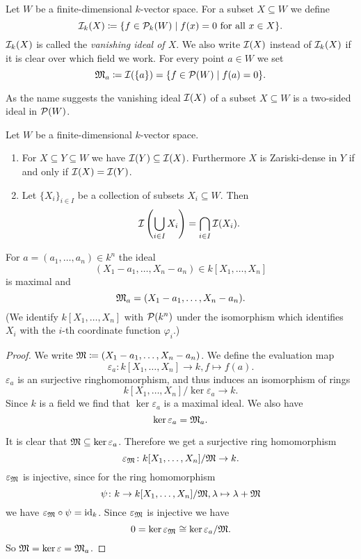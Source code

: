 \begin{defi}
  Let $W$ be a finite-dimensional $k$-vector space. For a subset $X \subseteq W$ we define
  \[
    \mathcal{I}_k(X) \coloneqq \{ f \in \mathcal{P}_k(W) \mid f(x) = 0 \text{ for all } x \in X \}.
  \]
  $\mathcal{I}_k(X)$ is called the \emph{vanishing ideal of $X$}. We also write $\mathcal{I}(X)$ instead of $\mathcal{I}_k(X)$ if it is clear over which field we work.
  For every point $a \in W$ we set
  \[
    \mathfrak{M}_a \coloneqq \mathcal{I}(\{a\}) = \{f \in \mathcal{P}(W) \mid f(a) = 0\}.
  \]
\end{defi}


\begin{rem}
  As the name suggests the vanishing ideal $\mathcal{I}(X)$ of a subset $X \subseteq W$ is a two-sided ideal in $\mathcal{P}(W)$.
\end{rem}


\begin{rem}
  Let $W$ be a finite-dimensional $k$-vector space.
  \begin{enumerate}[label=\emph{\alph*)},leftmargin=*]
    \item
      For $X \subseteq Y \subseteq W$ we have $\mathcal{I}(Y) \subseteq \mathcal{I}(X)$. Furthermore $X$ is Zariski-dense in $Y$ if and only if $\mathcal{I}(X) = \mathcal{I}(Y)$.
    \item
      Let $\{X_i\}_{i \in I}$ be a collection of subsets $X_i \subseteq W$. Then
      \[
        \mathcal{I}\left( \bigcup_{i \in I} X_i \right) = \bigcap_{i \in I} \mathcal{I}(X_i).
      \]
  \end{enumerate}
\end{rem}


\begin{lem}
  For $a = (a_1, \dotsc, a_n) \in k^n$ the ideal
  \[
    (X_1 - a_1, \dotsc, X_n - a_n) \in k[X_1, \dotsc, X_n]
  \]
  is maximal and
  \[
    \mathfrak{M}_a = (X_1 - a_1, \dotsc, X_n - a_n).
  \]
  (We identify $k[X_1, \dotsc, X_n]$ with $\mathcal{P}(k^n)$ under the isomorphism which identifies $X_i$ with the $i$-th coordinate function $\varphi_i$.)
\end{lem}
\begin{proof}
  We write $\mathfrak{M} \coloneqq (X_1 - a_1, \dotsc, X_n - a_n)$. We define the evaluation map
  \[
    \varepsilon_a \colon k[X_1, \dotsc, X_n] \to k, f \mapsto f(a).
  \]
  $\varepsilon_a$ is an surjective ringhomomorphism, and thus induces an isomorphism of rings
  \[
    k[X_1, \dotsc, X_n]/\ker \varepsilon_a \to k.
  \]
  Since $k$ is a field we find that $\ker \varepsilon_a$ is a maximal ideal. We also have
  \[
    \ker \varepsilon_a = \mathfrak{M}_a.
  \]
  
  It is clear that $\mathfrak{M} \subseteq \ker \varepsilon_a$. Therefore we get a surjective ring homomorphism
  \[
    \varepsilon_\mathfrak{M} \colon k[X_1, \dotsc, X_n]/\mathfrak{M} \to k.
  \]
  $\varepsilon_\mathfrak{M}$ is injective, since for the ring homomorphism
  \[
    \psi \colon k \to k[X_1, \dotsc, X_n]/\mathfrak{M}, \lambda \mapsto \lambda + \mathfrak{M}
  \]
  we have $\varepsilon_\mathfrak{M} \circ \psi = \operatorname{id}_k$. Since $\varepsilon_\mathfrak{M}$ is injective we have
  \[
    0 = \ker \varepsilon_\mathfrak{M} \cong \ker \varepsilon_a / \mathfrak{M}.
  \]
  So $\mathfrak{M} = \ker \varepsilon = \mathfrak{M}_a$.
\end{proof}

